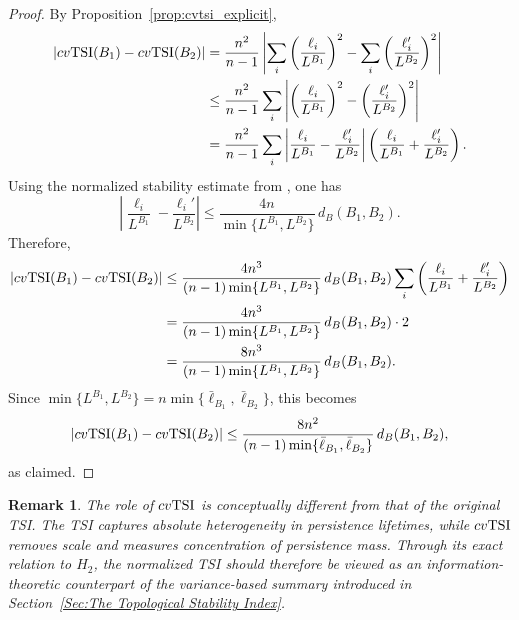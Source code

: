 \documentclass[11pt]{amsart}
\newtheorem*{remark}{Remark}
\theoremstyle{definition}
\newcommand{\tsi}[0]{\textup{TSI}}
\begin{document}
\begin{proof}
By Proposition~\ref{prop:cvtsi_explicit},
\begin{align*}
|cv\tsi(B_1)-cv\tsi(B_2)|
&=
\frac{n^2}{n-1}
\left|
\sum_i\left(\frac{\ell_i}{L^{B_1}}\right)^2
-
\sum_i\left(\frac{\ell_i'}{L^{B_2}}\right)^2
\right|\\
&\leq
\frac{n^2}{n-1}
\sum_i
\left|
\left(\frac{\ell_i}{L^{B_1}}\right)^2
-
\left(\frac{\ell_i'}{L^{B_2}}\right)^2
\right|\\
&=
\frac{n^2}{n-1}
\sum_i
\left|
\frac{\ell_i}{L^{B_1}}-\frac{\ell_i'}{L^{B_2}}
\right|
\left(
\frac{\ell_i}{L^{B_1}}+\frac{\ell_i'}{L^{B_2}}
\right).
\end{align*}
Using the normalized stability estimate from \cite{atienza_persistent_2019}, one has
\[
\left|
\frac{\ell_i}{L^{B_1}}-\frac{\ell_i'}{L^{B_2}}
\right|
\leq
\frac{4n}{\min\{L^{B_1},L^{B_2}\}}\,d_B(B_1,B_2).
\]
Therefore,
\begin{align*}
|cv\tsi(B_1)-cv\tsi(B_2)|
&\leq
\frac{4n^3}{(n-1)\min\{L^{B_1},L^{B_2}\}}\,d_B(B_1,B_2)
\sum_i
\left(
\frac{\ell_i}{L^{B_1}}+\frac{\ell_i'}{L^{B_2}}
\right)\\
&=
\frac{4n^3}{(n-1)\min\{L^{B_1},L^{B_2}\}}\,d_B(B_1,B_2)\cdot 2\\
&=
\frac{8n^3}{(n-1)\min\{L^{B_1},L^{B_2}\}}\,d_B(B_1,B_2).
\end{align*}
Since $\min\{L^{B_1},L^{B_2}\}=n\min\{\bar{\ell}_{B_1},\bar{\ell}_{B_2}\}$, this becomes
\[
|cv\tsi(B_1)-cv\tsi(B_2)|
\leq
\frac{8n^2}{(n-1)\min\{\bar{\ell}_{B_1},\bar{\ell}_{B_2}\}}\,d_B(B_1,B_2),
\]
as claimed.
\end{proof}

\begin{remark}\rm 
The role of $cv\tsi$ is conceptually different from that of the original TSI. The TSI captures absolute heterogeneity in persistence lifetimes, while $cv\tsi$ removes scale and measures concentration of persistence mass. Through its exact relation to $H_2$, the normalized TSI should therefore be viewed as an information-theoretic counterpart of the variance-based summary introduced in Section~\ref{Sec:The Topological Stability Index}.
\end{remark}




\end{document}
